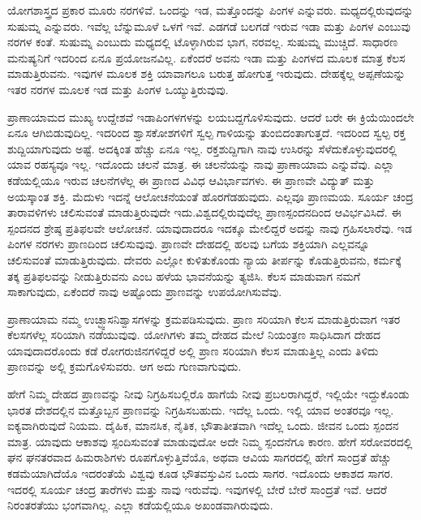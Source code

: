 ಯೋಗಶಾಸ್ತ್ರದ ಪ್ರಕಾರ ಮೂರು ನರಗಳಿವೆ. ಒಂದನ್ನು ಇಡ, ಮತ್ತೊಂದನ್ನು ಪಿಂಗಳ ಎನ್ನುವರು. ಮಧ್ಯದಲ್ಲಿರುವುದನ್ನು ಸುಷುಮ್ನ ಎನ್ನುವರು. ಇವೆಲ್ಲ ಬೆನ್ನುಮೂಳೆ ಒಳಗೆ ಇವೆ. ಎಡಗಡೆ ಬಲಗಡೆ ಇರುವ ಇಡಾ ಮತ್ತು ಪಿಂಗಳ ಎಂಬುವು ನರಗಳ ಕಂತೆ. ಸುಷುಮ್ನ ಎಂಬುದು ಮಧ್ಯದಲ್ಲಿ ಟೊಳ್ಳಾಗಿರುವ ಭಾಗ, ನರವಲ್ಲ. ಸುಷುಮ್ನ ಮುಚ್ಚಿದೆ. ಸಾಧಾರಣ ಮನುಷ್ಯನಿಗೆ ಇದರಿಂದ ಏನೂ ಪ್ರಯೋಜನವಿಲ್ಲ. ಏಕೆಂದರೆ ಅವನು ಇಡಾ ಮತ್ತು ಪಿಂಗಳದ ಮೂಲಕ ಮಾತ್ರ ಕೆಲಸ ಮಾಡುತ್ತಿರುವನು. ಇವುಗಳ ಮೂಲಕ ಶಕ್ತಿ ಯಾವಾಗಲೂ ಬರುತ್ತ ಹೋಗುತ್ತ ಇರುವುದು. ದೇಹಕ್ಕೆಲ್ಲ ಅಪ್ಪಣೆಯನ್ನು ಇತರ ನರಗಳ ಮೂಲಕ ಇಡ ಮತ್ತು ಪಿಂಗಳ ಒಯ್ಯುತ್ತಿರುವುವು.

ಪ್ರಾಣಾಯಾಮದ ಮುಖ್ಯ ಉದ್ದೇಶವೆ ಇಡಾಪಿಂಗಳಗಳನ್ನು ಲಯಬದ್ದಗೊಳಿಸುವುದು. ಆದರೆ ಬರೇ ಈ ಕ್ರಿಯೆಯಿಂದಲೇ ಏನೂ ಆಗಿಬಿಡುವುದಿಲ್ಲ. ಇದರಿಂದ ಶ್ವಾಸಕೋಶಗಳಿಗೆ ಸ್ವಲ್ಪ ಗಾಳಿಯನ್ನು ತುಂಬಿದಂತಾಗುತ್ತದೆ. ಇದರಿಂದ ಸ್ವಲ್ಪ ರಕ್ತ ಶುದ್ದಿಯಾಗುವುದು ಅಷ್ಟೆ. ಅದಕ್ಕಿಂತ ಹೆಚ್ಚು ಏನೂ ಇಲ್ಲ. ರಕ್ತಶುದ್ದಿಗಾಗಿ ನಾವು ಉಸಿರನ್ನು ಸೆಳೆದುಕೊಳ್ಳುವುದರಲ್ಲಿ ಯಾವ ರಹಸ್ಯವೂ ಇಲ್ಲ. ಇದೊಂದು ಚಲನೆ ಮಾತ್ರ. ಈ ಚಲನೆಯನ್ನು ನಾವು ಪ್ರಾಣಾಯಾಮ ಎನ್ನುವೆವು. ಎಲ್ಲಾ ಕಡೆಯಲ್ಲಿಯೂ ಇರುವ ಚಲನೆಗಳೆಲ್ಲ ಈ ಪ್ರಾಣದ ವಿವಿಧ ಆವಿರ್ಭಾವಗಳು. ಈ ಪ್ರಾಣವೇ ವಿದ್ಯುತ್ ಮತ್ತು ಅಯಸ್ಕಾಂತ ಶಕ್ತಿ. ಮೆದುಳು ಇದನ್ನೆ ಆಲೋಚನೆಯಂತೆ ಹೊರಗೆಡಹುವುದು. ಎಲ್ಲವೂ ಪ್ರಾಣಮಯ. ಸೂರ್ಯ ಚಂದ್ರ ತಾರಾವಳಿಗಳು ಚಲಿಸುವಂತೆ ಮಾಡುತ್ತಿರುವುದೇ ಇದು.\break ವಿಶ್ವದಲ್ಲಿರುವುದೆಲ್ಲ ಪ್ರಾಣಸ್ಪಂದನದಿಂದ ಆವಿರ್ಭವಿಸಿದೆ. ಈ ಸ್ಪಂದನದ ಶ್ರೇಷ್ಠ ಪ್ರತಿಫಲವೇ ಆಲೋಚನೆ. ಯಾವುದಾದರೂ ಇದಕ್ಕೂ ಮೇಲಿದ್ದರೆ ಅದನ್ನು ನಾವು ಗ್ರಹಿಸಲಾರೆವು. ಇಡ ಪಿಂಗಳ ನರಗಳು ಪ್ರಾಣದಿಂದ ಚಲಿಸುವುವು. ಪ್ರಾಣವೇ ದೇಹದಲ್ಲಿ ಹಲವು ಬಗೆಯ ಶಕ್ತಿಯಾಗಿ ಎಲ್ಲವನ್ನೂ ಚಲಿಸುವಂತೆ ಮಾಡುತ್ತಿರುವುದು. ದೇವರು ಎಲ್ಲೋ ಕುಳಿತುಕೊಂಡು ನ್ಯಾಯ ತೀರ್ಪನ್ನು ಕೊಡುತ್ತಿರುವನು, ಕರ್ಮಕ್ಕೆ ತಕ್ಕ ಪ್ರತಿಫಲವನ್ನು ನೀಡುತ್ತಿರುವನು ಎಂಬ ಹಳೆಯ ಭಾವನೆಯನ್ನು ತ್ಯಜಿಸಿ. ಕೆಲಸ ಮಾಡುವಾಗ ನಮಗೆ ಸಾಕಾಗುವುದು, ಏಕೆಂದರೆ ನಾವು ಅಷ್ಟೊಂದು ಪ್ರಾಣವನ್ನು ಉಪಯೋಗಿಸುವೆವು.

ಪ್ರಾಣಾಯಾಮ ನಮ್ಮ ಉಚ್ಛ್ವಾಸನಿಶ್ವಾಸಗಳನ್ನು ಕ್ರಮಪಡಿಸುವುದು. ಪ್ರಾಣ ಸರಿಯಾಗಿ ಕೆಲಸ ಮಾಡುತ್ತಿರುವಾಗ ಇತರ ಕೆಲಸಗಳೆಲ್ಲ ಸರಿಯಾಗಿ ನಡೆಯುವುವು. ಯೋಗಿಗಳು ತಮ್ಮ ದೇಹದ ಮೇಲೆ ನಿಯಂತ್ರಣ ಸಾಧಿಸಿದಾಗ ದೇಹದ ಯಾವುದಾದರೊಂದು ಕಡೆ ರೋಗರುಜಿನಗಳಿದ್ದರೆ ಅಲ್ಲಿ ಪ್ರಾಣ ಸರಿಯಾಗಿ ಕೆಲಸ ಮಾಡುತ್ತಿಲ್ಲ ಎಂದು ತಿಳಿದು ಪ್ರಾಣವನ್ನು ಅಲ್ಲಿ ಕ್ರಮಗೊಳಿಸುವರು. ಆಗ ಅದು ಗುಣವಾಗುವುದು.

ಹೇಗೆ ನಿಮ್ಮ ದೇಹದ ಪ್ರಾಣವನ್ನು ನೀವು ನಿಗ್ರಹಿಸಬಲ್ಲಿರೊ ಹಾಗೆಯೆ ನೀವು ಪ್ರಬಲರಾಗಿದ್ದರೆ, ಇಲ್ಲಿಯೇ ಇದ್ದುಕೊಂಡು ಭಾರತ ದೇಶದಲ್ಲಿನ ಮತ್ತೊಬ್ಬನ ಪ್ರಾಣವನ್ನು ನಿಗ್ರಹಿಸಬಹುದು. ಇದೆಲ್ಲ ಒಂದು. ಇಲ್ಲಿ ಯಾವ ಅಂತರವೂ ಇಲ್ಲ. ಐಕ್ಯವಾಗಿರುವುದೆ ನಿಯಮ. ದೈಹಿಕ, ಮಾನಸಿಕ, ನೈತಿಕ, ಭೌತಾತೀತವಾಗಿ ಇದೆಲ್ಲ ಒಂದು. ಜೀವನ ಒಂದು ಸ್ಪಂದನ ಮಾತ್ರ. ಯಾವುದು ಆಕಾಶವು ಸ್ಪಂದಿಸುವಂತೆ ಮಾಡುವುದೋ ಅದೇ ನಿಮ್ಮ ಸ್ಪಂದನೆಗೂ ಕಾರಣ. ಹೇಗೆ ಸರೋವರದಲ್ಲಿ ಘನ ಘನತರವಾದ ಹಿಮರಾಶಿಗಳು ರೂಪಗೊಳ್ಳುತ್ತಿವೆಯೊ, ಅಥವಾ ಆವಿಯ ಸಾಗರದಲ್ಲಿ ಹೇಗೆ ಸಾಂದ್ರತೆ ಹೆಚ್ಚು ಕಡಮೆಯಾಗಿದೆಯೊ ಇದರಂತೆಯೆ ವಿಶ್ವವು ಕೂಡ ಭೌತವಸ್ತುವಿನ ಒಂದು ಸಾಗರ. ಇದೊಂದು ಆಕಾಶದ ಸಾಗರ. ಇದರಲ್ಲಿ ಸೂರ್ಯ ಚಂದ್ರ ತಾರೆಗಳು ಮತ್ತು ನಾವು ಇರುವೆವು. ಇವುಗಳಲ್ಲಿ ಬೇರೆ ಬೇರೆ ಸಾಂದ್ರತೆ ಇವೆ. ಆದರೆ ನಿರಂತರತೆಯು ಭಂಗವಾಗಿಲ್ಲ. ಎಲ್ಲಾ ಕಡೆಯಲ್ಲಿಯೂ ಅಖಂಡವಾಗಿರುವುದು.

